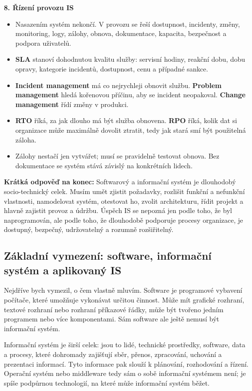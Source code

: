 \textbf{8. Řízení provozu IS}
\begin{itemize}
  \item Nasazením systém nekončí. V provozu se řeší dostupnost, incidenty, změny, monitoring, logy, zálohy, obnova, dokumentace, kapacita, bezpečnost a podpora uživatelů.
  \item \textbf{SLA} stanoví dohodnutou kvalitu služby: servisní hodiny, reakční dobu, dobu opravy, kategorie incidentů, dostupnost, cenu a případné sankce.
  \item \textbf{Incident management} má co nejrychleji obnovit službu. \textbf{Problem management} hledá kořenovou příčinu, aby se incident neopakoval. \textbf{Change management} řídí změny v produkci.
  \item \textbf{RTO} říká, za jak dlouho má být služba obnovena. \textbf{RPO} říká, kolik dat si organizace může maximálně dovolit ztratit, tedy jak stará smí být použitelná záloha.
  \item Zálohy nestačí jen vytvářet; musí se pravidelně testovat obnova. Bez dokumentace se systém stává závislý na konkrétních lidech.
\end{itemize}

\textbf{Krátká odpověď na konec:} Softwarový a informační systém je dlouhodobý socio-technický celek. Musím umět zjistit požadavky, rozlišit funkční a nefunkční vlastnosti, namodelovat systém, otestovat ho, zvolit architekturu, řídit projekt a hlavně zajistit provoz a údržbu. Úspěch IS se nepozná jen podle toho, že byl naprogramován, ale podle toho, že dlouhodobě podporuje procesy organizace, je dostupný, bezpečný, udržovatelný a rozumně rozšiřitelný.

\subsection*{Základní vymezení: software, informační systém a aplikovaný IS}

Nejdříve bych vymezil, o čem vlastně mluvím. Software je programové vybavení počítače, které umožňuje vykonávat určitou činnost. Může mít grafické rozhraní, textové rozhraní nebo rozhraní příkazové řádky, může být tvořeno jedním programem nebo více komponentami. Sám software ale ještě nemusí být informační systém.

Informační systém je širší celek: jsou to lidé, technické prostředky, software, data a procesy, které dohromady zajišťují sběr, přenos, zpracování, uchování a prezentaci informací. Tyto informace pak slouží k plánování, rozhodování a řízení. Operační systém nebo middleware tedy sám o sobě informační systémem není; je spíše podpůrnou technologií, na které může informační systém běžet.

